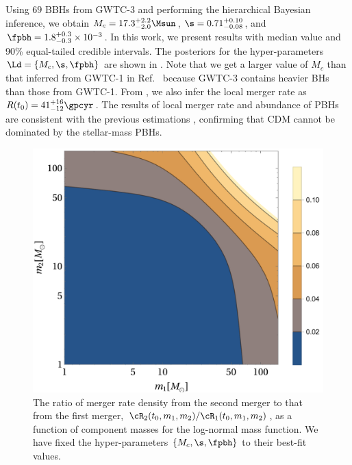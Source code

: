 \documentclass[
reprint,           %
superscriptaddress,%
amsmath,           %
amssymb,           %
aps,               %
prd,               %
notitlepage,       %
longbibliography,  %
floatfix,          %
nofootinbib,
]{revtex4-1}
\begin{document}
Using $69$ BBHs from GWTC-3 and performing the hierarchical Bayesian inference, we obtain $M_c = 17.3^{+2.2}_{-2.0} \Msun$, $\s = 0.71^{+0.10}_{-0.08}$, and $\fpbh = 1.8^{+0.3}_{-0.3} \times 10^{-3}$. In this work, we present results with median value and 90\% equal-tailed credible intervals. The posteriors for the hyper-parameters $\Ld = \{M_c, \s, \fpbh\}$ are shown in . Note that we get a larger value of $M_c$ than that inferred from GWTC-1 in Ref.~\cite{Wu:2020drm} because GWTC-3 contains heavier BHs than those from GWTC-1. From , we also infer the local merger rate as $R(t_0) = 41^{+16}_{-12} \gpcyr$. The results of local merger rate and abundance of PBHs are consistent with the previous estimations \cite{Sasaki:2016jop,Ali-Haimoud:2017rtz,Chen:2018czv,Chen:2018rzo,Chen:2019irf,Wu:2020drm,Chen:2021nxo,Chen:2022fda,Zheng:2022wqo}, confirming that CDM cannot be dominated by the stellar-mass PBHs.

\begin{figure}[tbp!]
	\centering
	\includegraphics[width=\linewidth]{ratio-log.pdf}
	\caption{\label{ratio-log}The ratio of merger rate density from the second merger to that from the first merger, $\cR_2(t_0, m_1, m_2)/\cR_1(t_0, m_1, m_2)$, as a function of component masses for the log-normal mass function. We have fixed the hyper-parameters $\{M_c, \s, \fpbh\}$ to their best-fit values.}
\end{figure}
\end{document}
